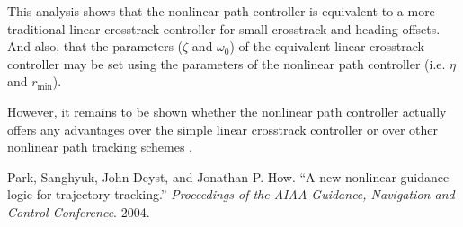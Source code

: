 \documentclass{article} %
\begin{document}
This analysis shows that the nonlinear path controller is equivalent
to a more traditional linear crosstrack controller for small
crosstrack and heading offsets.  And also, that the parameters
($\zeta$ and $\omega_0$) of the equivalent linear crosstrack
controller may be set using the parameters of the nonlinear path
controller (i.e. $\eta$ and $r_{\mathrm{min}}$).

However, it remains to be shown whether the nonlinear path controller
actually offers any advantages over the simple linear crosstrack
controller or over other nonlinear path tracking schemes
\cite{park2004}.

\begin{thebibliography}{1}
 Park, Sanghyuk, John Deyst, and Jonathan
  P. How. ``A new nonlinear guidance logic for trajectory tracking.''
  {\it Proceedings of the AIAA Guidance, Navigation and Control
    Conference}. 2004.
\end{thebibliography}
\end{document}
